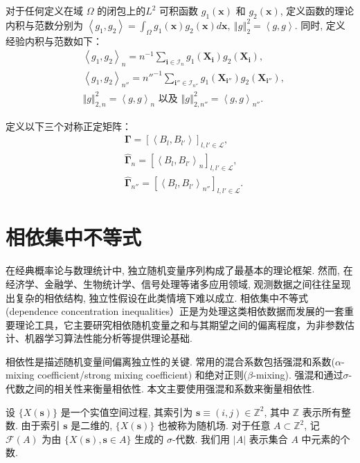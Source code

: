 \documentclass[a4paper,openay,14pt]{ctexbook}
\numberwithin{equation}{section}
\numberwithin{lem}{section}
\begin{document}
对于任何定义在域 $\Omega$ 的闭包上的$L^2$ 可积函数 $g_1(\boldsymbol{x})$ 和 $g_2(\boldsymbol{x})$, 定义函数的理论内积与范数分别为
\(\left<g_1,g_2\right> = \int_{\Omega}g_1(\boldsymbol{x})g_2(\boldsymbol{x})d\boldsymbol{x},~\left\Vert g\right\Vert^2_2 = \left<g,g\right>\). 同时, 定义经验内积与范数如下：
\begin{align*}
 &\left<g_1,g_2\right>_{n} = n^{-1}\sum_{\mathbf{i} \in \mathcal{I}_n} g_1(\boldsymbol{X}_{\mathbf{i}})g_2(\boldsymbol{X}_{\mathbf{i}}),\\
 & \left<g_1,g_2\right>_{n''} = n''^{-1}\sum_{\mathbf{i}''\in\mathcal{I}_{n''}}g_1(\boldsymbol{X}_{\mathbf{i}''})g_2(\boldsymbol{X}_{\mathbf{i}''}),\\
 & \left\Vert g\right\Vert^{2}_{2,n} = \left<g,g\right>_{n}\text{ 以及 } \left\Vert g\right\Vert^{2}_{2,n''} = \left<g,g\right>_{n''}.
\end{align*}

定义以下三个对称正定矩阵：
\begin{align}
    &\bm{\Gamma} = \left[\left\langle B_l,B_{l'}\right\rangle\right]_{l,l'\in\mathcal{L}}, \label{EQU:Gammalambda}\\
    &\hat{\bm{\Gamma}}_{n} = \left[\left\langle B_l,B_{l'}\right\rangle_{n}\right]_{l,l'\in\mathcal{L}},\label{EQU:hatGammalambdan}\\
    &\hat{\bm{\Gamma}}_{n''} = \left[\left\langle B_l,B_{l'}\right\rangle_{n''}\right]_{l,l'\in\mathcal{L}}. \label{EQU:hatGammalambdan''}
\end{align}


\section{相依集中不等式}
在经典概率论与数理统计中, 独立随机变量序列构成了最基本的理论框架. 然而, 在经济学、金融学、生物统计学、信号处理等诸多应用领域, 观测数据之间往往呈现出复杂的相依结构, 独立性假设在此类情境下难以成立. 相依集中不等式(dependence concentration inequalities）正是为处理这类相依数据而发展的一套重要理论工具，它主要研究相依随机变量之和与其期望之间的偏离程度，为非参数估计、机器学习算法性能分析等提供理论基础.

相依性是描述随机变量间偏离独立性的关键. 常用的混合系数包括强混和系数($\alpha$-mixing coefficient/strong mixing coefficient) 和绝对正则($\beta$-mixing). 强混和通过$\sigma$-代数之间的相关性来衡量相依性. 本文主要使用强混和系数来衡量相依性.

设 $\{X(\mathbf{s})\}$ 是一个实值空间过程, 其索引为 $\mathbf{s} \equiv (i, j) \in \mathbb{Z}^2$, 其中 $\mathbb{Z}$ 表示所有整数. 由于索引 $\mathbf{s}$ 是二维的, $\{X(\mathbf{s})\}$ 也被称为随机场. 对于任意 $A \subset \mathbb{Z}^2$, 记 $\mathcal{F}(A)$ 为由 $\{X(\mathbf{s}), \mathbf{s} \in A\}$ 生成的 $\sigma$-代数. 我们用 $|A|$ 表示集合 $A$ 中元素的个数.
\end{document}
